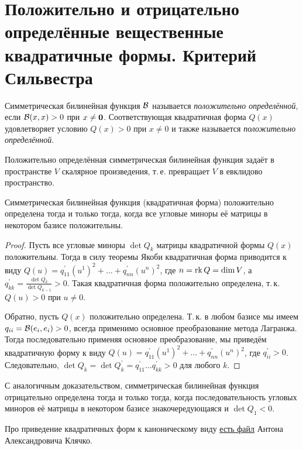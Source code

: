 \section{Положительно и отрицательно определённые вещественные квадратичные формы. Критерий Сильвестра}

\begin{definition}
    Симметрическая билинейная функция $\mathcal{B}$ называется \textit{положительно определённой}, если $\mathcal{B}(x, x) > 0$ при $x \ne \boldsymbol{0}$. Соответствующая квадратичная форма $Q(x)$ удовлетворяет условию $Q(x) > 0$ при $x \ne 0$ и также называется \textit{положительно определённой}.
\end{definition}

Положительно определённая симметрическая билинейная функция задаёт в пространстве $V$ скалярное произведения, т.\,е. превращает $V$ в евклидово пространство.

\begin{theorem}
    Симметрическая билинейная функция (квадратичная форма) положительно определена тогда и только тогда, когда все угловые миноры её матрицы в некотором базисе положительны.
\end{theorem}

\begin{proof}
    Пусть все угловые миноры $\det Q_k$ матрицы квадратичной формы $Q(x)$ положительны. Тогда в силу теоремы Якоби квадратичная форма приводится к виду $Q(u) = q^\prime_{11}(u^1)^2 + \ldots + q^\prime_{nn}(u^n)^2$, где $n = \operatorname{rk} Q = \dim V$, а $q^\prime_{kk} = \frac{\det Q_k}{\det Q_{k - 1}} > 0$. Такая квадратичная форма положительно определена, т.\,к. $Q(u) > 0$ при $u \ne 0$.

    Обратно, пусть $Q(x)$ положительно определена. Т.\,к. в любом базисе мы имеем $q_{ii} = \mathcal{B}(e_i, e_i) > 0$, всегда применимо основное преобразование метода Лагранжа. Тогда последовательно применяя основное преобразование, мы приведём квадратичную форму к виду $Q(u) = q^\prime_{11}(u^1)^2 + \ldots + q^\prime_{nn}(u^n)^2$, где $q^\prime_{ii} > 0$. Следовательно, $\det Q_k = \det Q^\prime_k = q^\prime_{11}\ldots q^\prime_{kk} > 0$ для любого $k$.
\end{proof}

\begin{remark}
    С аналогичным доказательством, симметрическая билинейная функция отрицательно определена тогда и только тогда, когда последовательность угловых миноров её матрицы в некотором базисе знакочередующаяся и $\det Q_1 < 0$.
\end{remark}

Про приведение квадратичных форм к каноническому виду \href{http://halgebra.math.msu.su/staff/klyachko/teaching/lin.al/QU.PDF}{есть файл} Антона Александровича Клячко. 

